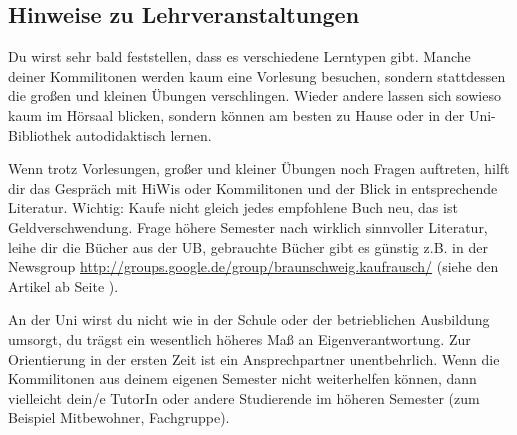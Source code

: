 \subsection{Hinweise zu Lehrveranstaltungen}

Du wirst sehr bald feststellen, dass es verschiedene Lerntypen gibt. Manche
deiner Kommilitonen werden kaum eine Vorlesung besuchen, sondern stattdessen die großen
und kleinen Übungen verschlingen. Wieder andere lassen sich sowieso kaum im
Hörsaal blicken, sondern können am besten zu Hause oder in der Uni-Bibliothek
autodidaktisch lernen.

Wenn trotz Vorlesungen, großer und kleiner Übungen noch Fragen
auftreten, hilft dir das Gespräch mit HiWis oder Kommilitonen und der Blick in
entsprechende Literatur.
Wichtig: Kaufe nicht gleich jedes empfohlene Buch neu,
das ist Geldverschwendung. Frage höhere Semester nach wirklich sinnvoller
Literatur, leihe dir die Bücher aus der UB, gebrauchte Bücher gibt es
günstig z.B. in der Newsgroup \url{http://groups.google.de/group/braunschweig.kaufrausch/} (siehe den Artikel
ab Seite \pageref{elekinf}). 

An der Uni wirst du nicht wie in der
Schule oder der betrieblichen Ausbildung umsorgt, du trägst ein wesentlich höheres
Maß an Eigenverantwortung. Zur Orientierung in der ersten Zeit ist ein
Ansprechpartner unentbehrlich. Wenn die Kommilitonen aus
deinem eigenen Semester nicht weiterhelfen können, dann vielleicht dein/e TutorIn oder andere
Studierende im höheren Semester (zum Beispiel Mitbewohner, Fachgruppe).
